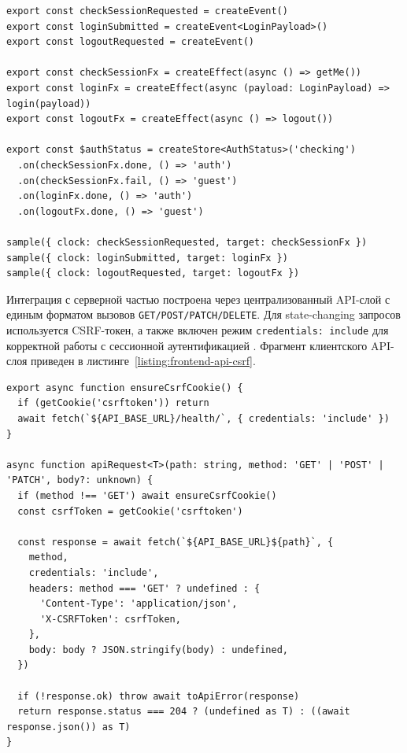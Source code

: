 \begin{listing}[H]
\caption{Модель состояния аутентификации на Effector}
\label{listing:frontend-auth-model}
\begin{mdframed}
\begin{verbatim}
export const checkSessionRequested = createEvent()
export const loginSubmitted = createEvent<LoginPayload>()
export const logoutRequested = createEvent()

export const checkSessionFx = createEffect(async () => getMe())
export const loginFx = createEffect(async (payload: LoginPayload) => login(payload))
export const logoutFx = createEffect(async () => logout())

export const $authStatus = createStore<AuthStatus>('checking')
  .on(checkSessionFx.done, () => 'auth')
  .on(checkSessionFx.fail, () => 'guest')
  .on(loginFx.done, () => 'auth')
  .on(logoutFx.done, () => 'guest')

sample({ clock: checkSessionRequested, target: checkSessionFx })
sample({ clock: loginSubmitted, target: loginFx })
sample({ clock: logoutRequested, target: logoutFx })
\end{verbatim}
\end{mdframed}
\end{listing}

Интеграция с серверной частью построена через централизованный API-слой с единым форматом вызовов \texttt{GET/POST/PATCH/DELETE}. Для state-changing запросов используется CSRF-токен, а также включен режим \texttt{credentials: include} для корректной работы с сессионной аутентификацией \cite{owasp_csrf_cheatsheet,django_docs_2026}. Фрагмент клиентского API-слоя приведен в листинге~\ref{listing:frontend-api-csrf}.

\begin{listing}[H]
\caption{Клиентский API-слой с CSRF-защитой}
\label{listing:frontend-api-csrf}
\begin{mdframed}
\begin{verbatim}
export async function ensureCsrfCookie() {
  if (getCookie('csrftoken')) return
  await fetch(`${API_BASE_URL}/health/`, { credentials: 'include' })
}

async function apiRequest<T>(path: string, method: 'GET' | 'POST' | 'PATCH', body?: unknown) {
  if (method !== 'GET') await ensureCsrfCookie()
  const csrfToken = getCookie('csrftoken')

  const response = await fetch(`${API_BASE_URL}${path}`, {
    method,
    credentials: 'include',
    headers: method === 'GET' ? undefined : {
      'Content-Type': 'application/json',
      'X-CSRFToken': csrfToken,
    },
    body: body ? JSON.stringify(body) : undefined,
  })

  if (!response.ok) throw await toApiError(response)
  return response.status === 204 ? (undefined as T) : ((await response.json()) as T)
}
\end{verbatim}
\end{mdframed}
\end{listing}

